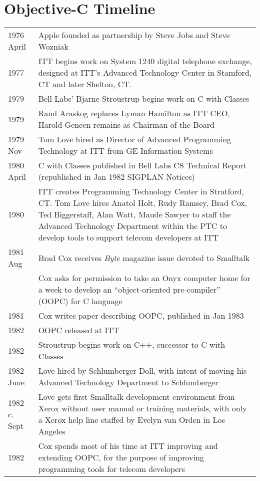 \documentclass[acmsmall,screen]{acmart}
\begin{document}
\section{Objective-C Timeline}
\begin{longtable}{lp{4.40in}}
1976 April    & Apple founded as partnership by Steve Jobs and Steve Wozniak \\
1977     & ITT begins work on System 1240 digital telephone exchange, designed at ITT's Advanced Technology Center in Stamford, CT and later Shelton, CT. \\
1979 	& Bell Labs' Bjarne Stroustrup begins work on C with Classes \\
1979 	& Rand Araskog replaces Lyman Hamilton as ITT CEO, Harold Geneen remains as Chairman of the Board \\
1979 Nov	& Tom Love hired as Director of Advanced Programming Technology at ITT from GE Information Systems \\
1980 April 	& C with Classes published in Bell Labs CS Technical Report 
            (republished in Jan 1982 SIGPLAN Notices) \\
1980 	& ITT creates Programming Technology Center in Stratford, CT. Tom Love hires 
         Anatol Holt, Rudy Ramsey, Brad Cox, Ted Biggerstaff, Alan Watt, Maude Sawyer
         to staff the Advanced Technology Department within the PTC to develop tools to 
         support telecom developers at ITT \\
1981 Aug	& Brad Cox receives \emph{Byte} magazine issue devoted to Smalltalk \\
        	& Cox asks for permission to take an Onyx computer home for a week to develop 
        	 an ``object-oriented pre-compiler'' (OOPC) for C language \\
1981	& Cox writes paper describing OOPC, published in Jan 1983 \\
1982 	& OOPC released at ITT \\
1982 	& Stroustrup begins work on C++, successor to C with Classes \\
1982 June	& Love hired by Schlumberger-Doll, with intent of moving his Advanced Technology 
            Department to Schlumberger \\
1982 c. Sept	& Love gets first Smalltalk development environment from Xerox without user manual 
     or training materials, with only a Xerox help line staffed by 
     Evelyn van Orden in Los Angeles \\
1982	& Cox spends most of his time at ITT improving and extending OOPC, for the purpose of improving programming tools for telecom developers \\

\end{longtable}
\end{document}
